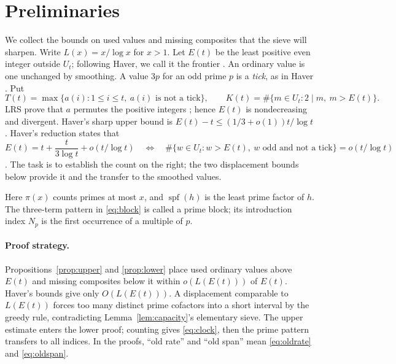 \documentclass[11pt]{article}
\theoremstyle{remark}
\newcommand{\U}{U}
\newcommand{\spf}{\operatorname{spf}}
\begin{document}
\section{Preliminaries}\label{sec:inputs}
We collect the bounds on used values and missing composites that the sieve will sharpen.
Write $L(x)=x/\log x$ for $x>1$. Let $E(t)$ be the least positive even
integer outside $\U_t$; following Haver, we call it the frontier
\cite[Sections~1--2]{haver}. An ordinary value is one unchanged by smoothing.
A value $3p$ for an odd prime $p$ is a \emph{tick}, as in Haver
\cite[Sections~1--2]{haver}. Put
\[
 T(t)=\max\{a(i):1\leq i\leq t,\ a(i)\text{ is not a tick}\},
 \qquad K(t)=\#\{m\in\U_t:2\mid m,\ m>E(t)\}.
\]
LRS prove that $a$ permutes the positive integers \cite[Theorem~1]{lrs};
hence $E(t)$ is nondecreasing and divergent.
Haver's sharp upper bound is
$E(t)-t\leq(1/3+o(1))t/\log t$ \cite[Theorem~1(d), Corollary~12(d)]{haver}.
Haver's reduction states that
\[
 E(t)=t+\frac{t}{3\log t}+o(t/\log t)
 \quad\Longleftrightarrow\quad
 \#\{w\in\U_t:w>E(t),\ w\text{ odd and not a tick}\}=o(t/\log t)
\]
\cite[Corollary~2(e)]{haver}. The task is to establish the count on the
right; the two displacement bounds below provide it and the transfer
to the smoothed values.

Here $\pi(x)$ counts primes at most $x$, and $\spf(h)$ is the least prime
factor of $h$. The three-term pattern in \eqref{eq:block} is called a
prime block; its introduction index $N_p$ is the first occurrence of a
multiple of $p$.

\paragraph{Proof strategy.}
Propositions~\ref{prop:upper} and \ref{prop:lower} place used ordinary
values above $E(t)$ and missing composites below it within $o(L(E(t)))$
of $E(t)$. Haver's bounds give only $O(L(E(t)))$. A displacement comparable to $L(E(t))$ forces too many distinct prime
cofactors into a short interval by the greedy rule, contradicting
Lemma~\ref{lem:capacity}'s elementary sieve. The upper estimate enters the
lower proof; counting gives \eqref{eq:clock}, then the prime pattern
transfers to all indices.
In the proofs, ``old rate'' and ``old span'' mean \eqref{eq:oldrate} and \eqref{eq:oldspan}.
\end{document}
